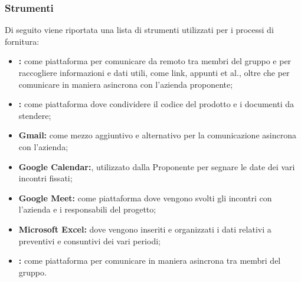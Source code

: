 \subsubsection{Strumenti}
Di seguito viene riportata una lista di strumenti utilizzati per i processi di fornitura:
\begin{itemize}
    \item \textbf{:} come piattaforma per comunicare da remoto tra membri del gruppo e per raccogliere informazioni e dati utili, come link, appunti et al., oltre che per comunicare in maniera asincrona con l'azienda proponente;
    \item \textbf{:} come piattaforma dove condividere il codice del prodotto e i documenti da stendere;
    \item \textbf{Gmail:} come mezzo aggiuntivo e alternativo per la comunicazione asincrona con l'azienda;
    \item \textbf{Google Calendar:}, utilizzato dalla Proponente per segnare le date dei vari incontri fissati;
    \item \textbf{Google Meet:} come piattaforma dove vengono svolti gli incontri con l'azienda e i responsabili del progetto; 
    \item \textbf{Microsoft Excel:} dove vengono inseriti e organizzati i dati relativi a preventivi e consuntivi dei vari periodi; 
    \item \textbf{:} come piattaforma per comunicare in maniera asincrona tra membri del gruppo. 
\end{itemize}
